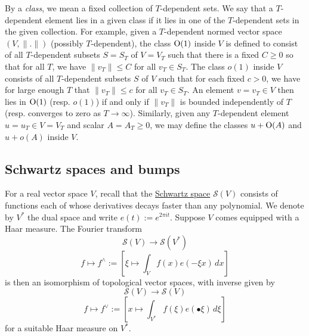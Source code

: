 \documentclass[reqno]{amsart} 
\numberwithin{equation}{section}
\numberwithin{theorem}{section}
\begin{document}
By a \emph{class}, we mean a fixed collection of $T$-dependent sets.  We say that a $T$-dependent element lies in a given class if it lies in one of the $T$-dependent sets in the given collection.  For example, given a $T$-dependent normed vector space $(V, \lVert . \rVert)$ (possibly $T$-dependent), the class $\operatorname{O}(1)$ inside $V$ is defined to consist of all $T$-dependent subsets $S = S_T$ of $V = V_T$ such that there is a fixed $C \geq 0$ so that for all $T$, we have $\lVert v_T \rVert \leq C$ for all $v_T \in S_T$.  The class $o(1)$ inside $V$ consists of all $T$-dependent subsets $S$ of $V$ such that for each fixed $c > 0$, we have for large enough $T$ that $\lVert v_T \rVert \leq c$ for all $v_T \in S_T$.  An element $v = v_T \in V$ then lies in $\operatorname{O}(1)$ (resp. $o(1)$) if and only if $\lVert v_T \rVert$ is bounded independently of $T$ (resp. converges to zero as $T \rightarrow \infty$).  Similarly, given any $T$-dependent element $u = u_T \in V = V_T$ and scalar $A = A_T \geq 0$, we may define the classes $u + \operatorname{O}(A)$ and $u + o(A)$ inside $V$.

\subsection{Schwartz spaces and bumps}\label{sec:d1a8de614869}
For a real vector space $V$, recall that the \href{https://en.wikipedia.org/wiki/Schwartz_space}{Schwartz space} $\mathcal{S}(V)$ consists of functions each of whose derivatives decays faster than any polynomial.  We denote by $V^*$ the dual space and write $e(t) := e^{2 \pi i t}$.  Suppose $V$ comes equipped with a Haar measure.  The Fourier transform
\begin{equation*}
\mathcal{S}(V) \rightarrow \mathcal{S}(V^*)
\end{equation*}
\begin{equation*}
f \mapsto f^\wedge := \left[ \xi \mapsto \int_{V} f(x) e(- \xi  x) \, d x \right]
\end{equation*}
is then an isomorphism of topological vector spaces, with inverse given by
\begin{equation*}
\mathcal{S}(V) \rightarrow \mathcal{S}(V)
\end{equation*}
\begin{equation*}
f \mapsto f^\vee := \left[ x \mapsto \int_{V^*} f(\xi) e(\bullet \xi) \, d \xi  \right]
\end{equation*}
for a suitable Haar measure on $V^*$.
\end{document}
